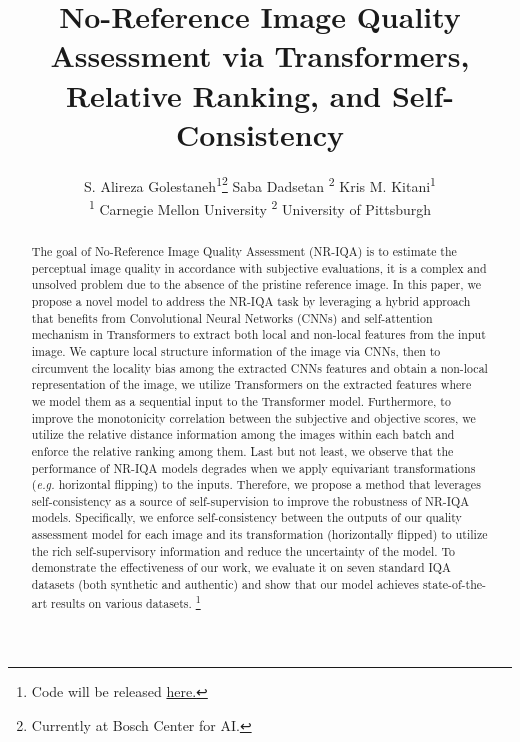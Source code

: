 \documentclass[10pt,twocolumn,letterpaper]{article}
\begin{document}
\title{No-Reference Image Quality Assessment via Transformers, Relative Ranking, and Self-Consistency}

\author{S. Alireza Golestaneh\textsuperscript{\rm 1}\thanks{Currently at Bosch Center for AI.} \quad  Saba Dadsetan \textsuperscript{\rm 2}  \quad Kris M. Kitani\textsuperscript{\rm 1}\\
\textsuperscript{\rm 1} Carnegie Mellon University \quad  \textsuperscript{\rm 2} University of Pittsburgh}


\maketitle

\begin{abstract}
The goal of No-Reference Image Quality Assessment (NR-IQA) is to estimate the perceptual image quality in accordance with subjective evaluations, it is a complex and unsolved problem due to the absence of the pristine reference image. 
In this paper, we propose a novel model to address the NR-IQA task by leveraging a hybrid approach that benefits from Convolutional Neural Networks (CNNs) and self-attention mechanism in Transformers to extract both local and non-local features from the input image.
We capture local structure information of the image via CNNs, then to circumvent the locality bias among the extracted CNNs features and  obtain a non-local representation of the image, we utilize Transformers on the extracted features where we model them as a sequential input to the Transformer model. 
Furthermore, to improve the monotonicity correlation between the subjective and objective scores,  we utilize the relative distance information among the images within each batch and enforce the relative ranking among them. 
Last but not least, we observe that the performance of NR-IQA models degrades when we  apply equivariant transformations (\textit{e.g.} horizontal flipping) to the inputs.
Therefore, we propose a method that leverages self-consistency as a source of self-supervision to improve the robustness of NR-IQA models. 
Specifically, we enforce self-consistency between the outputs of our quality assessment model for each image and its transformation (horizontally flipped) to utilize the rich self-supervisory information and reduce the uncertainty of the model. 
To demonstrate the effectiveness of our work, we evaluate it on seven standard IQA datasets (both synthetic and authentic) and show that our model achieves state-of-the-art results on various datasets. \footnote{Code will be released  \href{https://github.com/isalirezag/TReS}{here.}}
\end{abstract}
\end{document}
